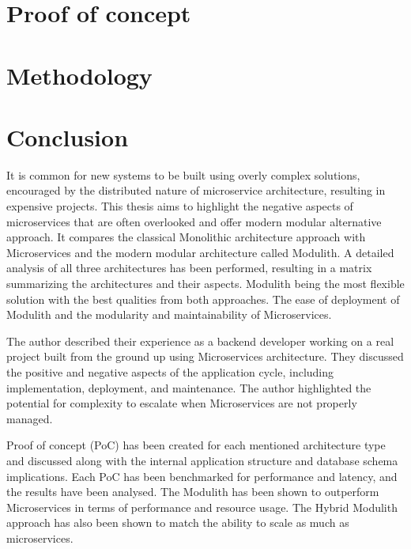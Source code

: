 \chapter{Proof of concept}
\label{chapter:example_application}



\chapter{Methodology}



\chapter{Conclusion}
It is common for new systems to be built using overly complex solutions, encouraged by the distributed nature of microservice architecture, resulting in expensive projects. This thesis aims to highlight the negative aspects of microservices that are often overlooked and offer modern modular alternative approach. It compares the classical Monolithic architecture approach with Microservices and the modern modular architecture called Modulith. A detailed analysis of all three architectures has been performed, resulting in a matrix summarizing the architectures and their aspects. Modulith being the most flexible solution with the best qualities from both approaches. The ease of deployment of Modulith and the modularity and maintainability of Microservices.

The author described their experience as a backend developer working on a real project built from the ground up using Microservices architecture. They discussed the positive and negative aspects of the application cycle, including implementation, deployment, and maintenance. The author highlighted the potential for complexity to escalate when Microservices are not properly managed.

Proof of concept (PoC) has been created for each mentioned architecture type and discussed along with the internal application structure and database schema implications. Each PoC has been benchmarked for performance and latency, and the results have been analysed. The Modulith has been shown to outperform Microservices in terms of performance and resource usage. The Hybrid Modulith approach has also been shown to match the ability to scale as much as microservices.

